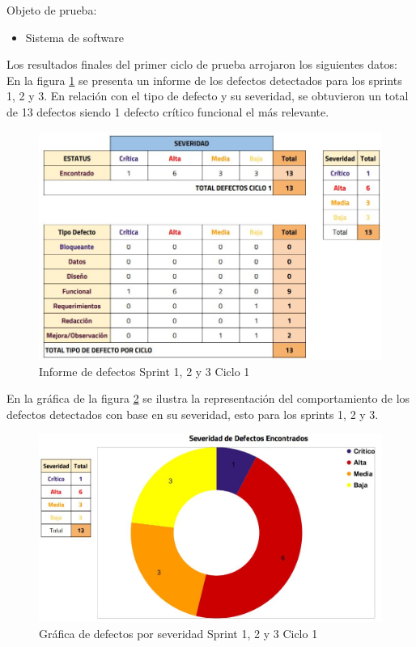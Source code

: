 Objeto de prueba:
\begin{itemize}
	\item Sistema de software
\end{itemize}

\newpage

Los resultados finales del primer ciclo de prueba arrojaron los siguientes datos:\\

En la figura \ref{fig:infos1c1} se presenta un informe de los defectos detectados para los sprints 1, 2 y 3. En relación con el tipo de defecto y su severidad, se obtuvieron un total de 13 defectos siendo 1 defecto crítico funcional el más relevante.

\begin{figure}[H]
	\begin{center}
		\includegraphics[width=.95\textwidth]{images/pruebas/s1c1}
		\caption{Informe de defectos Sprint 1, 2 y 3 Ciclo 1}
		\label{fig:infos1c1}
	\end{center}
\end{figure}

\newpage

En la gráfica de la figura \ref{fig:infos1c1-1} se ilustra la representación del comportamiento de los defectos detectados con base en su severidad, esto para los sprints 1, 2 y 3.

\begin{figure}[H]
	\begin{center}
		\includegraphics[width=.75\textwidth]{images/pruebas/s1c1-1}
		\caption{Gráfica de defectos por severidad Sprint 1, 2 y 3 Ciclo 1}
		\label{fig:infos1c1-1}
	\end{center}
\end{figure}

